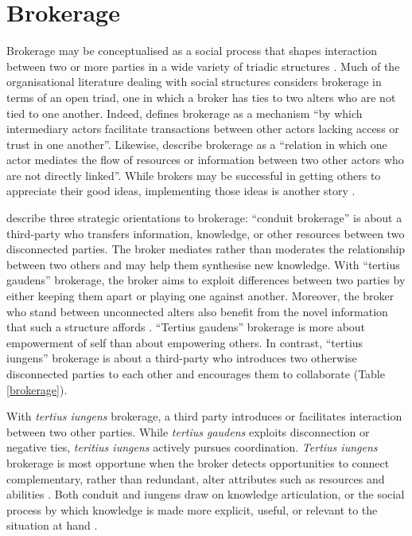 
\section{Brokerage}
Brokerage may be conceptualised as a social process that shapes interaction between two or more parties in a wide variety of triadic structures \citep{obstfeld2002knowledge}. Much of the organisational literature dealing with social structures considers brokerage in terms of an open triad, one in which a broker has ties to two alters who are not tied to one another. Indeed, \citet{marsden1982brokerage} defines brokerage as a mechanism \enquote{by which intermediary actors facilitate transactions between other actors lacking access or trust in one another}. Likewise, \citet{fernandez1994dilemma} describe brokerage as a \enquote{relation in which one actor mediates the flow of resources or information between two other actors who are not directly linked}. While brokers may be successful in getting others to appreciate their good ideas, implementing those ideas is another story \citep{marabelli2016}.\medskip

\citet{obstfeld2014brokerage} describe three strategic orientations to brokerage: \enquote{conduit brokerage} is about a third-party who transfers information, knowledge, or other resources between two disconnected parties. The broker mediates rather than moderates the relationship between two others and may help them synthesise new knowledge. With \enquote{tertius gaudens} brokerage, the broker aims to exploit differences between two parties by either keeping them apart or playing one against another. Moreover, the broker who stand between unconnected alters also benefit from the novel information that such a structure affords \citep{burt1992structural}. \enquote{Tertius gaudens} brokerage is more about empowerment of self than about empowering others. In contrast, \enquote{tertius iungens} brokerage is about a third-party who introduces two otherwise disconnected parties to each other and encourages them to collaborate (Table \ref{brokerage}). \medskip 

With \emph{tertius iungens} brokerage, a third party introduces or facilitates interaction between two other parties. While \emph{tertius gaudens} exploits disconnection or negative ties, \emph{teritius iungens} actively pursues coordination. \emph{Tertius iungens} brokerage is most opportune when the broker detects opportunities to connect complementary, rather than redundant, alter attributes such as resources and abilities \citep{obstfeld2014brokerage}. Both conduit and iungens draw on knowledge articulation, or the social process by which knowledge is made more explicit, useful, or relevant to the situation at hand \citep{obstfeld2005social,obstfeld2011saying,obstfeld2012creative}.

